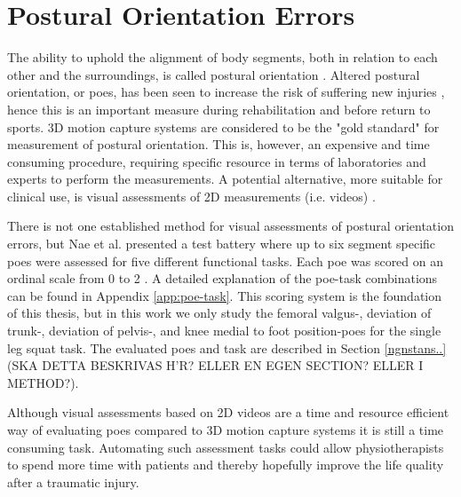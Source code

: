 
\section{Postural Orientation Errors}
The ability to uphold the alignment of body segments, both in relation to each other and the surroundings, is called postural orientation \cite{Horak2006}. Altered postural orientation, or \glspl{poe}, has been seen to increase the risk of suffering new injuries \cite{Hewett2005}, hence this is an important measure during rehabilitation and before return to sports. 3D motion capture systems are considered to be the "gold standard" for measurement of postural orientation. This is, however, an expensive and time consuming procedure, requiring specific resource in terms of laboratories and experts to perform the measurements. A potential alternative, more suitable for clinical use, is visual assessments of 2D measurements (i.e. videos) \cite{Nae2020}.

There is not one established method for visual assessments of postural orientation errors, but Nae et al. presented a test battery where up to six segment specific \glspl{poe} were assessed for five different functional tasks. Each \gls{poe} was scored on an ordinal scale from 0 to 2 \cite{Nae2017, Nae2020b}. A detailed explanation of the \gls{poe}-task combinations can be found in Appendix \ref{app:poe-task}. This scoring system is the foundation of this thesis, but in this work we only study the femoral valgus-, deviation of trunk-, deviation of pelvis-, and knee medial to foot position-\glspl{poe} for the single leg squat task. The evaluated \glspl{poe} and task are described in Section \ref{ngnstans..} (SKA DETTA BESKRIVAS H'R? ELLER EN EGEN SECTION? ELLER I METHOD?).

Although visual assessments based on 2D videos are a time and resource efficient way of evaluating \glspl{poe} compared to 3D motion capture systems it is still a time consuming task. Automating such assessment tasks could allow physiotherapists to spend more time with patients and thereby hopefully improve the life quality after a traumatic injury.



